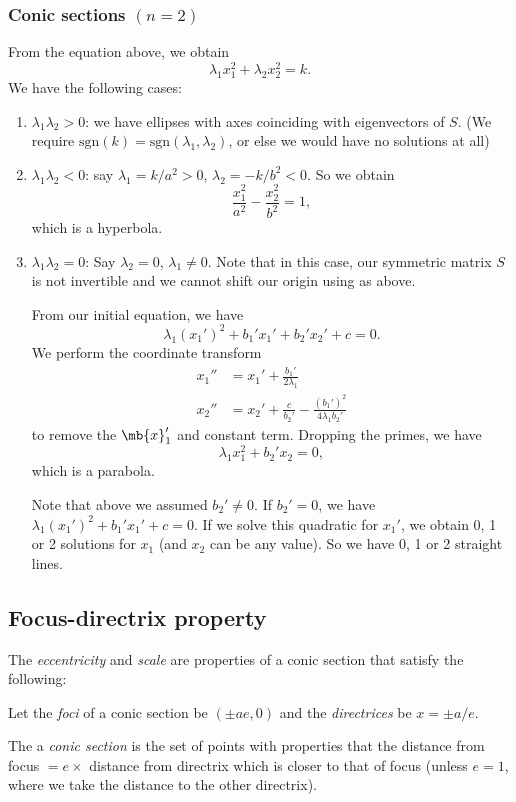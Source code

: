 \documentclass[a4paper]{article}
\begin{document}
\subsubsection{Conic sections \texorpdfstring{$(n = 2)$}{(n = 2)}}
From the equation above, we obtain
\[
\lambda_1x_1^2 + \lambda_2x_2^2 = k.
\]
We have the following cases:
\begin{enumerate}
\item $\lambda_1\lambda_2 > 0$: we have ellipses with axes coinciding with eigenvectors of $S$. (We require $\mathrm{sgn}(k) = \mathrm{sgn}(\lambda_1,\lambda_2)$, or else we would have no solutions at all)
\item $\lambda_1\lambda_2 < 0$: say $\lambda_1 = k/a^2 > 0$, $\lambda_2 = -k/b^2 < 0$. So we obtain
\[
\frac{x_1^2}{a^2} - \frac{x_2^2}{b^2} = 1,
\]
which is a hyperbola.
\item $\lambda_1\lambda_2 = 0$: Say $\lambda_2 = 0$, $\lambda_1\not= 0$. Note that in this case, our symmetric matrix $S$ is not invertible and we cannot shift our origin using as above.

From our initial equation, we have
\[
\lambda_1(x_1')^2 + b_1'x_1' + b_2' x_2' + c = 0.
\]
We perform the coordinate transform
\begin{align*}
  x_1'' &= x_1' + \frac{b_1'}{2\lambda_1}\\
  x_2'' &= x_2' + \frac{c}{b_2'} - \frac{(b_1')^2}{4\lambda_1b_2'}
\end{align*}
to remove the $\mb{x}_1'$ and constant term. Dropping the primes, we have
\[
\lambda_1 x_1^2 + b_2' x_2 = 0,
\]
which is a parabola.

Note that above we assumed $b_2'\not= 0$. If $b_2' = 0$, we have $\lambda_1(x_1')^2 + b_1' x_1' + c = 0$. If we solve this quadratic for $x_1'$, we obtain 0, 1 or 2 solutions for $x_1$ (and $x_2$ can be any value). So we have 0, 1 or 2 straight lines.
\end{enumerate}

\subsection{Focus-directrix property}
\begin{defi}
  The \emph{eccentricity} and \emph{scale} are properties of a conic section that satisfy the following:

  Let the \emph{foci} of a conic section be $(\pm ae, 0)$ and the \emph{directrices} be $x = \pm a/e$.

  The a \emph{conic section} is the set of points with properties that the distance from focus $= e \times$ distance from directrix which is closer to that of focus (unless $e = 1$, where we take the distance to the other directrix).
\end{defi}
\end{document}
